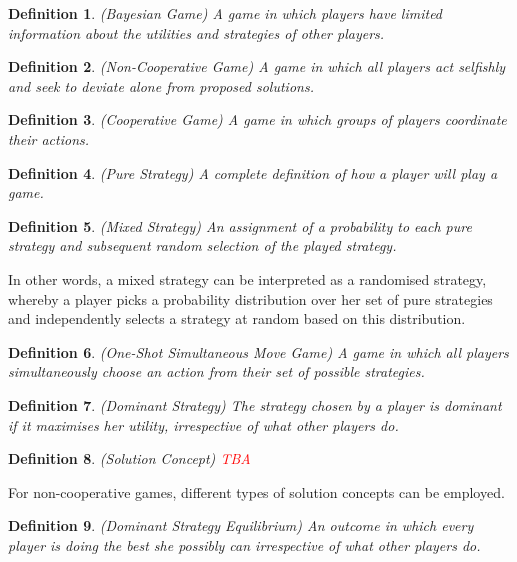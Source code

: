 \documentclass{article}
\newtheorem{definition}{Definition}
\begin{document}
\begin{definition}
(Bayesian Game) A game in which players have limited information about the utilities and strategies of other players.
\end{definition}

\begin{definition}
(Non-Cooperative Game) A game in which all players act selfishly and seek to deviate alone from proposed solutions.
\end{definition}

\begin{definition}
(Cooperative Game) A game in which groups of players coordinate their actions.
\end{definition}

\begin{definition}
(Pure Strategy) A complete definition of how a player will play a game.
\end{definition}

\begin{definition}
(Mixed Strategy) An assignment of a probability to each pure strategy and subsequent random selection of the played strategy.
\end{definition}

In other words, a mixed strategy can be interpreted as a randomised strategy, whereby a player picks a probability distribution over her set of pure strategies and independently selects a strategy at random based on this distribution.

\begin{definition}
(One-Shot Simultaneous Move Game) A game in which all players simultaneously choose an action from their set of possible strategies.
\end{definition}

\begin{definition}
(Dominant Strategy) The strategy chosen by a player is dominant if it maximises her utility, irrespective of what other players do.
\end{definition}

\begin{definition}
(Solution Concept) \textcolor{red}{TBA}
\end{definition}

For non-cooperative games, different types of solution concepts can be employed.

\begin{definition}
(Dominant Strategy Equilibrium) An outcome in which every player is doing the best she possibly can irrespective of what other players do.
\end{definition}
\end{document}
